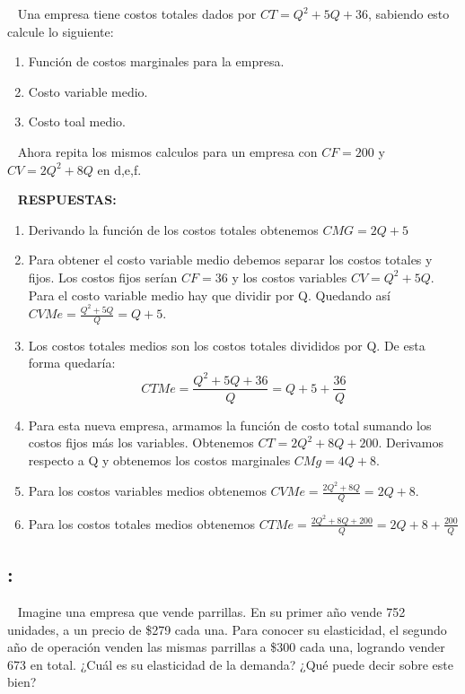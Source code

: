 \documentclass[
  letterpaper,
  DIV=11,
  numbers=noendperiod]{scrreport}
\begin{document}
~ Una empresa tiene costos totales dados por \(CT = {Q}^2 + 5Q + 36\),
sabiendo esto calcule lo siguiente:

\begin{enumerate}
\def\labelenumi{\alph{enumi})}
\item
  Función de costos marginales para la empresa.
\item
  Costo variable medio.
\item
  Costo toal medio.
\end{enumerate}

~ Ahora repita los mismos calculos para un empresa con \(CF = 200\) y
\(CV = 2{Q}^2 + 8Q\) en d,e,f.

~ \textbf{RESPUESTAS:}

\begin{enumerate}
\def\labelenumi{\alph{enumi})}
\item
  Derivando la función de los costos totales obtenemos \(CMG = 2Q + 5\)
\item
  Para obtener el costo variable medio debemos separar los costos
  totales y fijos. Los costos fijos serían \(CF = 36\) y los costos
  variables \(CV = {Q}^2 + 5Q\). Para el costo variable medio hay que
  dividir por Q. Quedando así \(CVMe = \frac{{Q}^2+ 5Q}{Q} = Q + 5\).
\item
  Los costos totales medios son los costos totales divididos por Q. De
  esta forma quedaría:
  \[CTMe = \frac{{Q}^2 + 5Q + 36}{Q} = Q + 5 + \frac{36}{Q}\]
\item
  Para esta nueva empresa, armamos la función de costo total sumando los
  costos fijos más los variables. Obtenemos \(CT = 2{Q}^2 + 8Q + 200\).
  Derivamos respecto a Q y obtenemos los costos marginales
  \(CMg = 4Q + 8\).
\item
  Para los costos variables medios obtenemos
  \(CVMe = \frac{2{Q}^2 + 8Q}{Q} = 2Q + 8\).
\item
  Para los costos totales medios obtenemos
  \(CTMe = \frac{2{Q}^2 + 8Q + 200}{Q} = 2Q + 8 + \frac{200}{Q}\)
\end{enumerate}

\hypertarget{section-15}{%
\subsection{:}\label{section-15}}

~ Imagine una empresa que vende parrillas. En su primer año vende 752
unidades, a un precio de \$279 cada una. Para conocer su elasticidad, el
segundo año de operación venden las mismas parrillas a \$300 cada una,
logrando vender 673 en total. ¿Cuál es su elasticidad de la demanda?
¿Qué puede decir sobre este bien?
\end{document}
